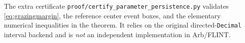 The extra certificate
\texttt{proof/certify\_parameter\_persistence.py}
validates \eqref{eq:grazingmargin}, the reference
center event boxes, and the elementary numerical
inequalities in the theorem. It relies on the
original directed-\texttt{Decimal} interval
backend and is \emph{not} an independent
implementation in Arb/FLINT.

